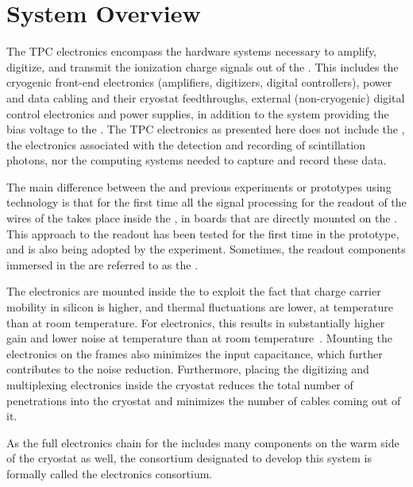 \section{System Overview}
\label{sec:fdsp-tpcelec-overview}

The TPC electronics encompass the hardware systems necessary to 
amplify, digitize, and transmit the  ionization charge 
signals out of the   . This 
includes the cryogenic front-end electronics (amplifiers, digitizers, 
digital controllers), power and data cabling and their cryostat 
feedthroughs, external (non-cryogenic) digital control electronics and 
power supplies, in addition to the system providing the bias voltage
to the .  The TPC electronics as presented here does not 
include the , the electronics associated with the detection 
and recording of  scintillation photons, nor the  
computing systems needed to capture and record these data.

The main difference between the    
and previous experiments or prototypes using  technology is
that for the first time all the signal processing for the readout of the
wires of the  takes place inside the , in boards that 
are directly mounted on the . This approach to the 
readout has been tested for the first time in the  prototype,
and is also being adopted by the  experiment. Sometimes, the 
 readout components immersed in the  are referred 
to as the . 

The electronics are mounted inside the  to exploit the fact that 
charge carrier mobility in silicon is higher, and thermal fluctuations are lower,  
at  temperature than at room temperature. For  
electronics, this results in substantially higher gain and lower noise 
at  temperature than at room temperature~\cite{DeGeronimo:2011zz}.
Mounting the  electronics on the  frames also minimizes 
the input capacitance, which further contributes to the noise reduction.  
Furthermore, placing the digitizing and multiplexing electronics inside 
the cryostat reduces the total number of penetrations into the cryostat 
and minimizes the number of cables coming out of it.

As the full  electronics chain for the  includes 
many components on the warm side of the cryostat as well, the  
consortium designated to develop this system is formally called 
the    electronics consortium.

